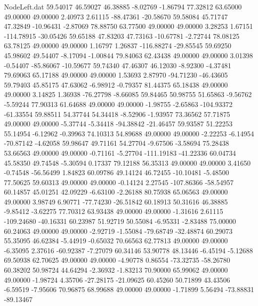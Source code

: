 \begin{filecontents}{NodeLeft.dat}
  59.54017   46.59027   46.38885    -8.02769   -1.86794   77.32812   63.65000   49.00000   49.00000    2.40973    2.61115  -88.47361  -20.58670
  59.58084   45.71747   47.32849   -10.96431   -2.87069   78.88750   63.77500   49.00000   49.00000    3.28253    1.67151 -114.78915  -30.05426
  59.65188   47.83203   47.73163   -10.67781   -2.72744   78.08125   63.78125   49.00000   49.00000    1.16797    1.26837 -116.88274  -29.85545
  59.69250   45.98602   49.54407    -8.17094   -1.00844   79.84063   62.43438   49.00000   49.00000    3.01398   -0.54407  -85.86067  -10.59677
  59.74340   47.46307   46.12030    -8.92300   -4.37481   79.69063   65.17188   49.00000   49.00000    1.53693    2.87970  -94.71230  -46.43605
  59.79403   45.85175   47.63062    -6.98912   -0.79357   81.44375   65.18438   49.00000   49.00000    3.14825    1.36938  -76.27798   -8.66085
  59.84465   50.98755   51.65863    -9.56762   -5.59244   77.90313   61.64688   49.00000   49.00000   -1.98755   -2.65863 -104.93372  -61.33554
  59.88511   54.37744   54.34418    -8.52906   -1.93957   73.36562   57.71875   49.00000   49.00000   -5.37744   -5.34418  -94.38842  -21.46457
  59.93587   51.22253   55.14954    -6.12962   -0.39963   74.10313   54.89688   49.00000   49.00000   -2.22253   -6.14954  -70.87142   -4.62058
  59.98647   49.71161   54.27704    -9.67506   -3.58694   75.28438   53.66563   49.00000   49.00000   -0.71161   -5.27704 -111.19183  -41.22336
  60.04734   45.58350   49.74548    -5.30594    0.17337   79.12188   56.35313   49.00000   49.00000    3.41650   -0.74548  -56.56499    1.84823
  60.09786   49.14124   46.72455   -10.10481   -5.48500   77.50625   59.60313   49.00000   49.00000   -0.14124    2.27545 -107.86366  -58.54957
  60.14857   45.01251   42.09229    -6.63100   -2.26188   80.75938   65.06563   49.00000   49.00000    3.98749    6.90771  -77.74230  -26.51842
  60.18913   50.31616   46.38885    -9.85412   -3.62275   77.70312   63.93438   49.00000   49.00000   -1.31616    2.61115 -109.24680  -40.16331
  60.23987   51.92719   50.55084    -6.95331   -2.83488   75.00000   60.24063   49.00000   49.00000   -2.92719   -1.55084  -79.68749  -32.48874
  60.29073   55.35095   46.62384    -5.44919   -0.65032   70.66563   62.77813   49.00000   49.00000   -6.35095    2.37616  -60.92387   -7.27079
  60.34146   53.90778   48.13446    -6.45194   -5.12688   69.50938   62.70625   49.00000   49.00000   -4.90778    0.86554  -73.32735  -58.26780
  60.38202   50.98724   44.64294    -2.36932   -1.83213   70.90000   65.99062   49.00000   49.00000   -1.98724    4.35706  -27.28175  -21.09625
  60.45260   50.71899   43.43506    -6.59519   -7.95606   70.96875   68.99688   49.00000   49.00000   -1.71899    5.56494  -73.88831  -89.13467

\end{filecontents}
